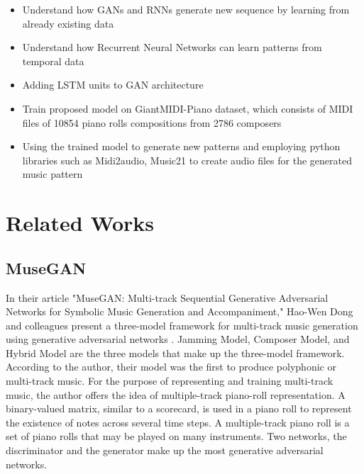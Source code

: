 \documentclass[letterpaper]{article}
\begin{document}
\begin{itemize}
    \item Understand how GANs and RNNs generate new sequence by learning from already existing data
    \item Understand how Recurrent Neural Networks can learn patterns from temporal data
    \item Adding LSTM units to GAN architecture
    \item Train proposed model on GiantMIDI-Piano dataset, which consists of MIDI files of  10854 piano rolls compositions from 2786 composers
    \item Using the trained model to generate new patterns and employing python libraries such as Midi2audio, Music21 to create audio files for the generated music pattern
\end{itemize}

\section{Related Works}

\subsection{MuseGAN}

In their article "MuseGAN: Multi-track Sequential Generative Adversarial Networks for Symbolic Music Generation and Accompaniment," Hao-Wen Dong and colleagues present a three-model framework for multi-track music generation using generative adversarial networks \cite{b2}. Jamming Model, Composer Model, and Hybrid Model are the three models that make up the three-model framework. According to the author, their model was the first to produce polyphonic or multi-track music. For the purpose of representing and training multi-track music, the author offers the idea of multiple-track piano-roll representation. A binary-valued matrix, similar to a scorecard, is used in a piano roll to represent the existence of notes across several time steps. A multiple-track piano roll is a set of piano rolls that may be played on many instruments. Two networks, the discriminator and the generator make up the most generative adversarial networks. 
\end{document}
